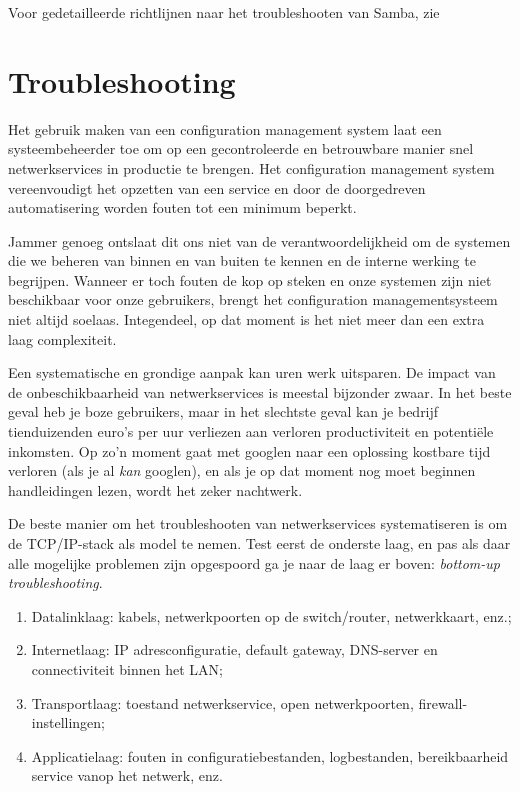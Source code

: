 Voor gedetailleerde richtlijnen naar het troubleshooten van Samba, zie~\textcite{TrigdellEtAl2010,CarterEtAl2010}

\section{Troubleshooting}
\label{sec:troubleshooting-1}

Het gebruik maken van een configuration management system laat een systeembeheerder toe om op een gecontroleerde en betrouwbare manier snel netwerkservices in productie te brengen. Het configuration management system vereenvoudigt het opzetten van een service en door de doorgedreven automatisering worden fouten tot een minimum beperkt.

Jammer genoeg ontslaat dit ons niet van de verantwoordelijkheid om de systemen die we beheren van binnen en van buiten te kennen en de interne werking te begrijpen. Wanneer er toch fouten de kop op steken en onze systemen zijn niet beschikbaar voor onze gebruikers, brengt het configuration managementsysteem niet altijd soelaas. Integendeel, op dat moment is het niet meer dan een extra laag complexiteit.

Een systematische en grondige aanpak kan uren werk uitsparen. De impact van de onbeschikbaarheid van netwerkservices is meestal bijzonder zwaar. In het beste geval heb je boze gebruikers, maar in het slechtste geval kan je bedrijf tienduizenden euro's per uur verliezen aan verloren productiviteit en potentiële inkomsten. Op zo'n moment gaat met googlen naar een oplossing kostbare tijd verloren (als je al \emph{kan} googlen), en als je op dat moment nog moet beginnen handleidingen lezen, wordt het zeker nachtwerk.

De beste manier om het troubleshooten van netwerkservices systematiseren is om de TCP/IP-stack als model te nemen. Test eerst de onderste laag, en pas als daar alle mogelijke problemen zijn opgespoord ga je naar de laag er boven: \emph{bottom-up troubleshooting}.

\begin{enumerate}
  \item Datalinklaag: kabels, netwerkpoorten op de switch/router, netwerkkaart, enz.;
  \item Internetlaag: IP adresconfiguratie, default gateway, DNS-server en connectiviteit binnen het LAN;
  \item Transportlaag: toestand netwerkservice, open netwerkpoorten, firewall-in\-stel\-lingen;
  \item Applicatielaag: fouten in configuratiebestanden, logbestanden, bereikbaarheid service vanop het netwerk, enz.
\end{enumerate}

